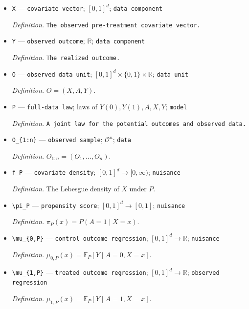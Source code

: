 \documentclass{article}
\begin{document}
\begin{itemize}
  \item \texttt{X} --- \texttt{covariate vector}; \([0,1]^d\); \texttt{data component}
  \par\smallskip\noindent\emph{Definition.} \texttt{The observed pre-\allowbreak{}treatment covariate vector.}
  \item \texttt{Y} --- \texttt{observed outcome}; \(\mathbb{R}\); \texttt{data component}
  \par\smallskip\noindent\emph{Definition.} \texttt{The realized outcome.}
  \item \texttt{O} --- \texttt{observed data unit}; \([0,1]^d\times\{0,1\}\times\mathbb{R}\); \texttt{data unit}
  \par\smallskip\noindent\emph{Definition.} \(O=(X,A,Y)\).
  \item \texttt{P} --- \texttt{full-\allowbreak{}data law}; laws of \(Y(0),Y(1),A,X,Y\); \texttt{model}
  \par\smallskip\noindent\emph{Definition.} \texttt{A joint law for the potential outcomes and observed data.}
  \item \texttt{O\_\allowbreak{}\{1:\allowbreak{}n\}\allowbreak{}} --- \texttt{observed sample}; \(\mathcal{O}^n\); \texttt{data}
  \par\smallskip\noindent\emph{Definition.} \(O_{1:n}=(O_1,\ldots,O_n)\).
  \item \texttt{f\_\allowbreak{}P} --- \texttt{covariate density}; \([0,1]^d\to[0,\infty)\); \texttt{nuisance}
  \par\smallskip\noindent\emph{Definition.} The Lebesgue density of \(X\) under \(P\).
  \item \texttt{\textbackslash{}\allowbreak{}pi\_\allowbreak{}P} --- \texttt{propensity score}; \([0,1]^d\to[0,1]\); \texttt{nuisance}
  \par\smallskip\noindent\emph{Definition.} \(\pi_P(x)=P(A=1\mid X=x)\).
  \item \texttt{\textbackslash{}\allowbreak{}mu\_\allowbreak{}\{0,\allowbreak{}P\}\allowbreak{}} --- \texttt{control outcome regression}; \([0,1]^d\to\mathbb{R}\); \texttt{nuisance}
  \par\smallskip\noindent\emph{Definition.} \(\mu_{0,P}(x)=\mathbb{E}_P[Y\mid A=0,X=x]\).
  \item \texttt{\textbackslash{}\allowbreak{}mu\_\allowbreak{}\{1,\allowbreak{}P\}\allowbreak{}} --- \texttt{treated outcome regression}; \([0,1]^d\to\mathbb{R}\); \texttt{observed regression}
  \par\smallskip\noindent\emph{Definition.} \(\mu_{1,P}(x)=\mathbb{E}_P[Y\mid A=1,X=x]\).

\end{itemize}
\end{document}
